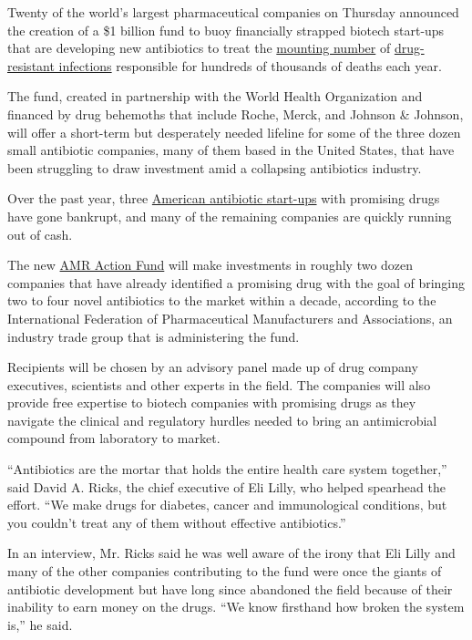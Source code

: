 Twenty of the world's largest pharmaceutical companies on Thursday
announced the creation of a \$1 billion fund to buoy financially
strapped biotech start-ups that are developing new antibiotics to treat
the
\href{https://www.nytimes3xbfgragh.onion/2019/04/06/health/drug-resistant-candida-auris.html}{mounting
number} of
\href{https://www.nytimes3xbfgragh.onion/2020/01/17/health/antibiotics-resistance-new-drugs.html}{drug-resistant
infections} responsible for hundreds of thousands of deaths each year.

The fund, created in partnership with the World Health Organization and
financed by drug behemoths that include Roche, Merck, and Johnson \&
Johnson, will offer a short-term but desperately needed lifeline for
some of the three dozen small antibiotic companies, many of them based
in the United States, that have been struggling to draw investment amid
a collapsing antibiotics industry.

Over the past year, three
\href{https://www.nytimes3xbfgragh.onion/2019/12/25/health/antibiotics-new-resistance.html}{American
antibiotic start-ups} with promising drugs have gone bankrupt, and many
of the remaining companies are quickly running out of cash.

The new \href{https://amractionfund.com/}{AMR Action Fund} will make
investments in roughly two dozen companies that have already identified
a promising drug with the goal of bringing two to four novel antibiotics
to the market within a decade, according to the International Federation
of Pharmaceutical Manufacturers and Associations, an industry trade
group that is administering the fund.

Recipients will be chosen by an advisory panel made up of drug company
executives, scientists and other experts in the field. The companies
will also provide free expertise to biotech companies with promising
drugs as they navigate the clinical and regulatory hurdles needed to
bring an antimicrobial compound from laboratory to market.

``Antibiotics are the mortar that holds the entire health care system
together,'' said David A. Ricks, the chief executive of Eli Lilly, who
helped spearhead the effort. ``We make drugs for diabetes, cancer and
immunological conditions, but you couldn't treat any of them without
effective antibiotics.''

In an interview, Mr. Ricks said he was well aware of the irony that Eli
Lilly and many of the other companies contributing to the fund were once
the giants of antibiotic development but have long since abandoned the
field because of their inability to earn money on the drugs. ``We know
firsthand how broken the system is,'' he said.

